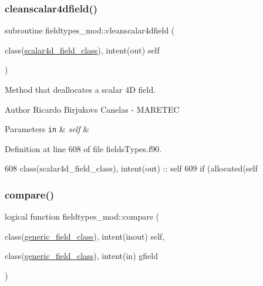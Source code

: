 \subsubsection{\texorpdfstring{cleanscalar4dfield()}{cleanscalar4dfield()}}
{\footnotesize\ttfamily subroutine fieldtypes\+\_\+mod\+::cleanscalar4dfield (\begin{DoxyParamCaption}\item[{class(\mbox{\hyperlink{structfieldtypes__mod_1_1scalar4d__field__class}{scalar4d\+\_\+field\+\_\+class}}), intent(out)}]{self }\end{DoxyParamCaption})\hspace{0.3cm}{\ttfamily [private]}}



Method that deallocates a scalar 4D field. 

\begin{DoxyAuthor}{Author}
Ricardo Birjukovs Canelas -\/ M\+A\+R\+E\+T\+EC 
\end{DoxyAuthor}

\begin{DoxyParams}[1]{Parameters}
\mbox{\tt in}  & {\em self} & \\
\hline
\end{DoxyParams}


Definition at line 608 of file fields\+Types.\+f90.


\begin{DoxyCode}
608     \textcolor{keywordtype}{class}(scalar4d\_field\_class), \textcolor{keywordtype}{intent(out)} :: self
609     \textcolor{keywordflow}{if} (\textcolor{keyword}{allocated}(self%
\end{DoxyCode}
\mbox{\label{namespacefieldtypes__mod_aad356f6f10d8edc58c56f02c796423f3}} 
\subsubsection{\texorpdfstring{compare()}{compare()}}
{\footnotesize\ttfamily logical function fieldtypes\+\_\+mod\+::compare (\begin{DoxyParamCaption}\item[{class(\mbox{\hyperlink{structfieldtypes__mod_1_1generic__field__class}{generic\+\_\+field\+\_\+class}}), intent(inout)}]{self,  }\item[{class(\mbox{\hyperlink{structfieldtypes__mod_1_1generic__field__class}{generic\+\_\+field\+\_\+class}}), intent(in)}]{gfield }\end{DoxyParamCaption})\hspace{0.3cm}{\ttfamily [private]}}



